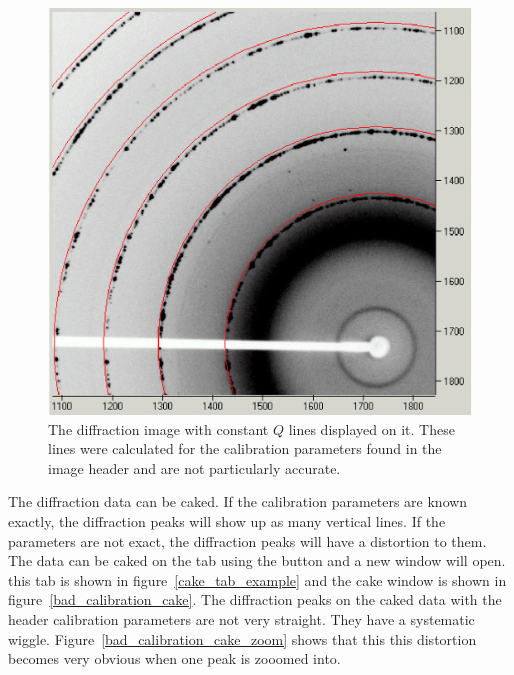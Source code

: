 \begin{figure}
    \centering
    \includegraphics[scale=.75]
    {figures/bad_calibration_diffraction_image.eps}
    \caption{The diffraction image with constant $Q$
    lines displayed on it. These lines were calculated
    for the calibration parameters found in the
    image header and are not particularly accurate.}
    \label{bad_calibration_diffraction_image}
\end{figure}

The diffraction data can be caked. 
If the calibration parameters are known exactly, 
the diffraction peaks will show up as many vertical lines.
If the parameters are not exact, the diffraction peaks
will have a distortion to them.
The data can be caked on the  tab using the 
 button and a new window will open. 
this tab is shown in figure~\ref{cake_tab_example} 
and the cake window is shown in 
figure~\ref{bad_calibration_cake}.
The diffraction peaks on the caked data with the header 
calibration parameters are not very straight. They have a
systematic wiggle. 
Figure~\ref{bad_calibration_cake_zoom} shows that this 
this distortion becomes very obvious when one peak is
zooomed into.


